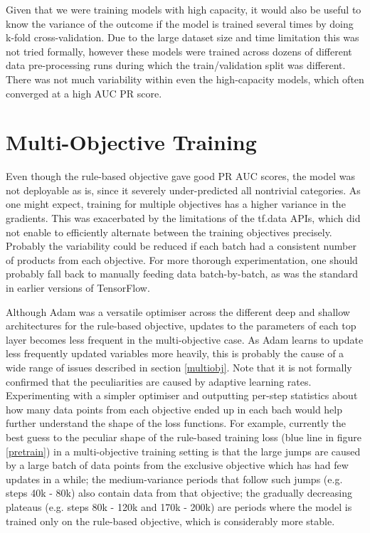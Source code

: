 Given that we were training models with high capacity, it would also be useful to know the variance of the outcome if the model is trained several times by doing k-fold cross-validation.
Due to the large dataset size and time limitation this was not tried formally, however these models were trained across dozens of different data pre-processing runs during which the train/validation split was different.
There was not much variability within even the high-capacity models, which often converged at a high AUC PR score.

\section{Multi-Objective Training}

Even though the rule-based objective gave good PR AUC scores, the model was not deployable as is, since it severely under-predicted all nontrivial categories.
As one might expect, training for multiple objectives has a higher variance in the gradients.
This was exacerbated by the limitations of the tf.data APIs, which did not enable to efficiently alternate between the training objectives precisely.
Probably the variability could be reduced if each batch had a consistent number of products from each objective.
For more thorough experimentation, one should probably fall back to manually feeding data batch-by-batch, as was the standard in earlier versions of TensorFlow.

Although Adam was a versatile optimiser across the different deep and shallow architectures for the rule-based objective, updates to the parameters of each top layer becomes less frequent in the multi-objective case.
As Adam learns to update less frequently updated variables more heavily, this is probably the cause of a wide range of issues described in section \ref{multiobj}.
Note that it is not formally confirmed that the peculiarities are caused by adaptive learning rates.
Experimenting with a simpler optimiser and outputting per-step statistics about how many data points from each objective ended up in each bach would help further understand the shape of the loss functions.
For example, currently the best guess to the peculiar shape of the rule-based training loss (blue line in figure \ref{pretrain}) in a multi-objective training setting is that the large jumps are caused by a large batch of data points from the exclusive objective which has had few updates in a while; the medium-variance periods that follow such jumps (e.g. steps 40k - 80k) also contain data from that objective; the gradually decreasing plateaus (e.g. steps 80k - 120k and 170k - 200k) are periods where the model is trained only on the rule-based objective, which is considerably more stable.

